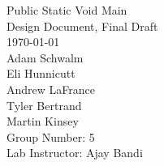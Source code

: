 \begin{titlepage}
\begin{center}

\vspace*{3.0 cm}
{\Huge Public Static Void Main}\\[0.7cm]
{\Large Design Document, Final Draft}\\[3.8cm]
{\Large \today}\\[0.5cm]
Adam Schwalm\\
Eli Hunnicutt\\
Andrew LaFrance\\
Tyler Bertrand\\
Martin Kinsey\\[4.0cm]

Group Number: 5\\
Lab Instructor: Ajay Bandi
  

  
\end{center}
\end{titlepage}
